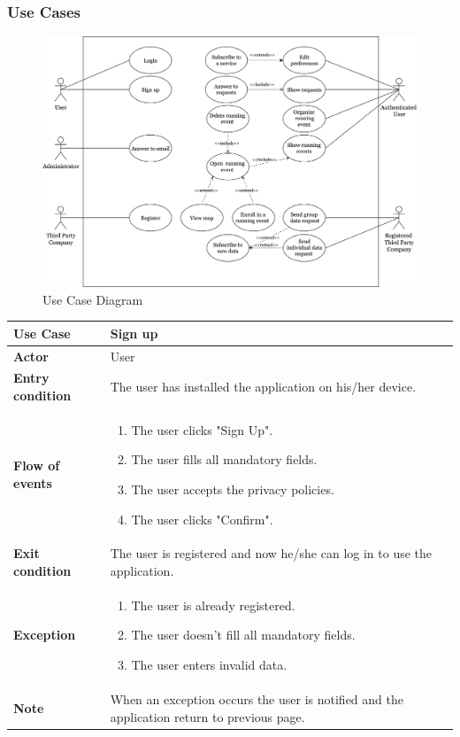 \documentclass[../main.tex]{subfiles}
\begin{document}
	\subsubsection{Use Cases}
	\begin{figure}[H]
		\centering
		\includegraphics[scale=.052]{images/useCaseTrackMe.png}
		\caption{Use Case Diagram \label{fig:Use Case Diagram}}
	\end{figure}
	\begin{center}
		\begin{tabular}{p{3cm}p{8.28cm}}
			\hline
			\textbf{Use Case} & Sign up\\
			\hline
			\textbf{Actor} & User\\
			\hline
			\textbf{Entry condition} & The user has installed the application on his/her device.\\
			\hline
			\textbf{Flow of events} & \begin{enumerate}
				\linespread{0}\item The user clicks "Sign Up".
				\linespread{0}\item The user fills all mandatory fields.
				\linespread{0}\item The user accepts the privacy policies.
				\linespread{0}\item The user clicks "Confirm".
			\end{enumerate}\\
			\hline
			\textbf{Exit condition} & The user is registered and now he/she can log in to use the application.\\
			\hline
			\textbf{Exception} & \begin{enumerate}
				\linespread{0}\item The user is already registered.
				\linespread{0}\item The user doesn't fill all mandatory fields.
				\linespread{0}\item The user enters invalid data.
			\end{enumerate}\\
			\hline
			\textbf{Note} & When an exception occurs the user is notified and the application return to previous page.\\
			\hline
		\end{tabular}
	\end{center}
\end{document}
